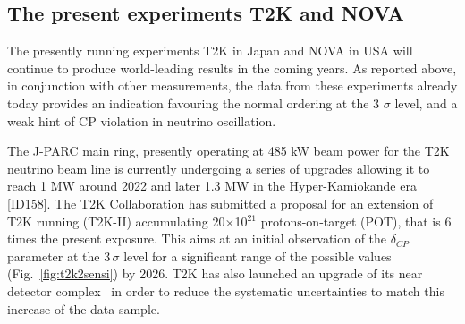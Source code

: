 

\subsection{The present experiments T2K and NOVA}

The presently running experiments T2K in Japan and NOVA in USA will continue to produce world-leading results in the coming years. As reported above, in conjunction with other measurements, the data from these experiments already today provides an indication favouring the normal ordering at the 3 $\sigma$ level, and a weak hint of CP violation in neutrino oscillation. %

The J-PARC main ring, presently operating at 485 kW beam power for the T2K neutrino beam line is currently undergoing a series of upgrades allowing it to reach 1 MW around 2022 and later 1.3 MW in the Hyper-Kamiokande era [ID158]. %
The T2K Collaboration has submitted a proposal for an extension of T2K running (T2K-II) accumulating 20$\times$10$^{21}$ protons-on-target (POT), that is 6 times the present exposure.
This aims at an initial observation of the $\delta_{CP}$ parameter at the 3\,$\sigma$ level for a significant range of the possible values (Fig.~\ref{fig:t2k2sensi}) by 2026. T2K has also launched an upgrade of its near detector complex~\cite{Abe:2019whr} in order to reduce the systematic uncertainties to match this increase of the data sample. %

